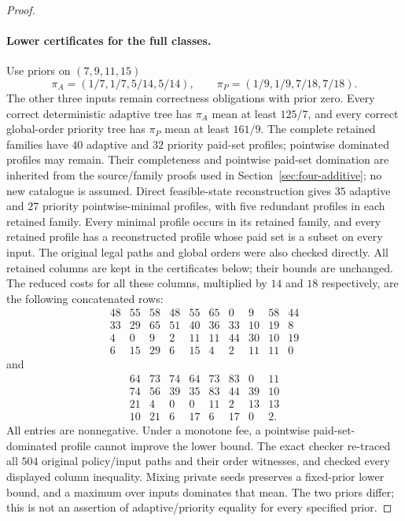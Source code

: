 \begin{proof}
\paragraph*{Lower certificates for the full classes.}
Use priors on $(7,9,11,15)$
\[
 \pi_A=(1/7,1/7,5/14,5/14),\qquad
 \pi_P=(1/9,1/9,7/18,7/18).
\]
The other three inputs remain correctness obligations with prior zero.
Every correct deterministic adaptive tree has $\pi_A$ mean at least
$125/7$, and every correct global-order priority tree has $\pi_P$ mean
at least $161/9$. The complete retained families have $40$ adaptive and $32$ priority
paid-set profiles; pointwise dominated profiles may remain. Their completeness
and pointwise paid-set domination are inherited from the source/family
proofs used in Section~\ref{sec:four-additive}; no new catalogue is assumed.
Direct feasible-state reconstruction gives $35$ adaptive and $27$
priority pointwise-minimal profiles, with five redundant profiles in
each retained family. Every minimal profile occurs in its retained
family, and every retained profile has a reconstructed profile whose
paid set is a subset on every input. The original legal paths and
global orders were also checked directly. All retained columns are
kept in the certificates below; their bounds are unchanged.
The reduced costs for all these columns, multiplied by $14$ and $18$
respectively, are the following concatenated rows:
\[
\begin{array}{rrrrrrrrrr}
48&55&58&48&55&65&0&9&58&44\\
33&29&65&51&40&36&33&10&19&8\\
4&0&9&2&11&11&44&30&10&19\\
6&15&29&6&15&4&2&11&11&0
\end{array}
\]
and
\[
\begin{array}{rrrrrrrr}
64&73&74&64&73&83&0&11\\
74&56&39&35&83&44&39&10\\
21&4&0&0&11&2&13&13\\
10&21&6&17&6&17&0&2.
\end{array}
\]
All entries are nonnegative. Under a monotone fee, a pointwise
paid-set-dominated profile cannot improve the lower bound. The exact
checker re-traced all $504$ original policy/input paths and their order
witnesses, and checked every displayed column inequality. Mixing private
seeds preserves a fixed-prior lower bound, and a maximum over inputs
dominates that mean. The two priors differ; this is not an assertion
of adaptive/priority equality for every specified prior.


\end{proof}
